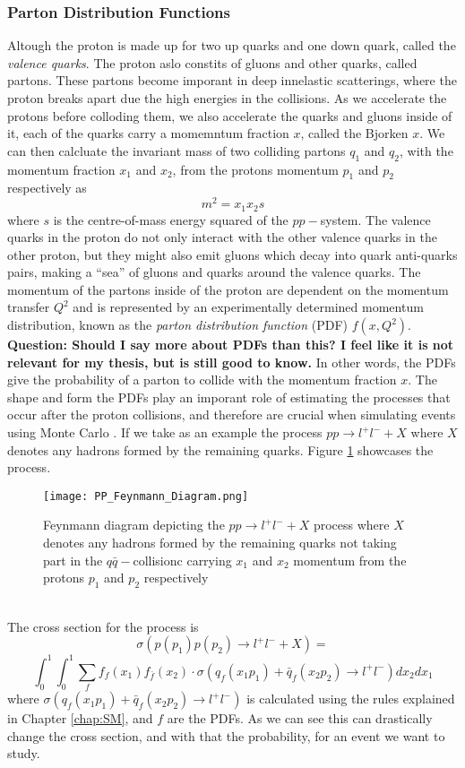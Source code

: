 \documentclass[12pt, a4paper]{book}
\begin{document}
\subsubsection{Parton Distribution Functions}
Altough the proton is made up for two up quarks and one down quark, called the \textit{valence quarks}. The proton aslo constits of gluons and other quarks, called partons. These partons become imporant in deep innelastic scatterings, 
where the proton breaks apart due the high energies in the collisions. As we accelerate the protons before colloding them, we also accelerate the quarks and gluons inside of it, each of the quarks carry a momemntum fraction $x$, 
called the Bjorken $x$. We can then calcluate the invariant mass of two colliding partons $q_1$ and $q_2$, with the momentum fraction $x_1$ and $x_2$, from the protons momentum $p_1$ and $p_2$ respectively as
$$
m^2=x_1x_2s
$$
where $s$ is the centre-of-mass energy squared of the $pp-$system. The valence quarks in the proton do not only interact with the other valence quarks in the other proton, but they might also emit gluons which decay into quark anti-quarks pairs, 
making a “sea” of gluons and quarks around the valence quarks. The momentum of the partons inside of the proton are dependent on the momentum transfer $Q^2$ and is represented by an experimentally determined momentum distribution, 
known as the \textit{parton distribution function} (PDF) \cite{PDF} $f(x,Q^2)$. \textbf{Question: Should I say more about PDFs than this? I feel like it is not relevant for my thesis, but is still good to know.} In other words, the PDFs give the probability of a parton to collide with the momentum fraction $x$. The shape and form the PDFs play 
an imporant role of estimating the processes that occur after the proton collisions, and therefore are crucial when simulating events using Monte Carlo \cite{MC_PDF}.  If we take as an example the process 
$pp\rightarrow l^+l^-+X$ where $X$ denotes any hadrons formed by the remaining quarks. Figure \ref{fig:Feynann_PDF} showcases the process.
\begin{figure}[!ht]
    \centering
    \texttt{[image: PP\_Feynmann\_Diagram.png]}
    \caption[Feynam diagram from $pp-$collision]{Feynmann diagram depicting the $pp\rightarrow l^+l^-+X$ process where $X$ denotes any hadrons formed by the remaining quarks
    not taking part in the $q\bar{q}-$collisionc carrying $x_1$ and $x_2$ momentum from the protons $p_1$ and $p_2$ respectively}\label{fig:Feynann_PDF}
\end{figure}
\\The cross section for the process is 
$$
\sigma\left(p(p_1) p(p_2)\rightarrow l^+l^- +X\right)=
$$
\begin{equation}\label{eq:PDF_xsec}
    \int_{0}^{1}\int_{0}^{1}\sum_{f}f_f(x_1)f_{\bar{f}}(x_2)\cdot\sigma\left(q_f(x_1p_1)+\bar{q}_f(x_2p_2)\rightarrow l^+l^- \right) dx_2dx_1
\end{equation}
where $\sigma\left(q_f(x_1p_1)+\bar{q}_f(x_2p_2)\rightarrow l^+l^- \right)$ is calculated using the rules explained in Chapter \ref{chap:SM}, and $f$ are the PDFs. As we can see this can drastically change the cross section, and with that the 
probability, for an event we want to study. 
\end{document}
